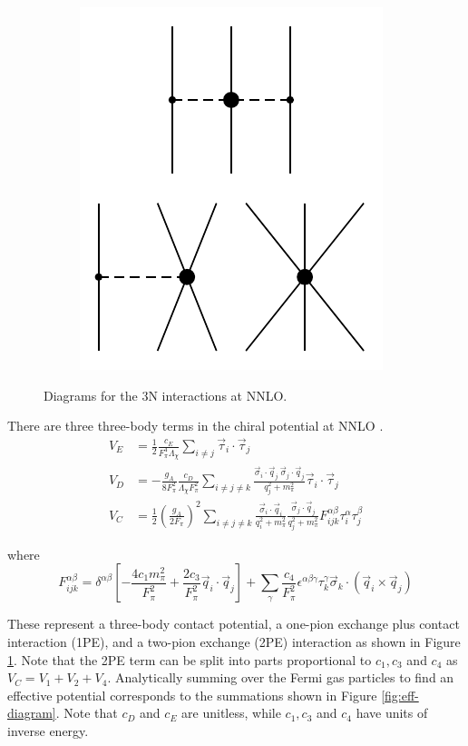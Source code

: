 \documentclass[%
 preprint,
 amsmath,amssymb,
 aps,
]{revtex4-1}
\begin{document}
\begin{figure}
\begin{subfigure}{0.25\textwidth}
\includegraphics[page=2]{Figures/3NFDiagrams}
\end{subfigure}
\caption{\label{fig:3NF}Diagrams for the 3N interactions at NNLO.}
\end{figure}

There are three three-body terms in the chiral potential at NNLO \cite{PhysRevC.66.064001}. 
\begin{align}
V_E&=\frac{1}{2}\frac{c_E }{F_\pi^4\Lambda_\chi}\sum_{i\neq j} \vec{\tau}_i\cdot\vec{\tau}_j \label{eq:V_E} \\
V_D&=-\frac{ g_A}{8F_\pi^2}\frac{c_D}{\Lambda_\chi F_\pi^2}\sum_{i\neq j \neq k} \frac{ \vec{\sigma}_i\cdot\vec{q}_j\:\vec{\sigma}_j\cdot\vec{q}_j }{q^2_j+m_\pi^2} \vec{\tau}_i\cdot\vec{\tau}_j \label{eq:V_D}\\
V_{C} &= \frac{1}{2}\left(\frac{g_A}{2F_\pi}\right)^2\sum_{i\neq j \neq k} \frac{ \vec{\sigma}_i\cdot\vec{q}_i}{q_i^2+m_\pi^2}\frac{\vec{\sigma}_j\cdot\vec{q}_j }{q^2_j+m_\pi^2} F_{ijk}^{\alpha\beta}\tau_i^{\alpha}\tau_j^\beta \label{eq:V_c}
\end{align}

where 
\begin{equation}
F_{ijk}^{\alpha\beta}=\delta^{\alpha \beta}\left[-\frac{4c_1m_\pi^2}{F_\pi^2}+\frac{2c_3}{F_\pi^2}\vec{q}_i\cdot\vec{q}_j\right]+\sum_\gamma\frac{c_4}{F_\pi^2}\epsilon^{\alpha\beta\gamma}\tau^\gamma_k\vec{\sigma}_k\cdot\left(\vec{q}_i\times\vec{q}_j\right)
\end{equation}

These represent a three-body contact potential, a one-pion exchange plus contact interaction (1PE), and a two-pion exchange (2PE) interaction as shown in Figure \ref{fig:3NF}. Note that the 2PE term can be split into parts proportional to $c_1, c_3$ and $c_4$ as $V_C=V_1+V_2+V_4$. Analytically summing over the Fermi gas particles to find an effective potential corresponds to the summations shown in Figure \ref{fig:eff-diagram}. Note that $c_D$ and $c_E$ are unitless, while $c_1, c_3$ and $c_4$ have units of inverse energy.
\end{document}
